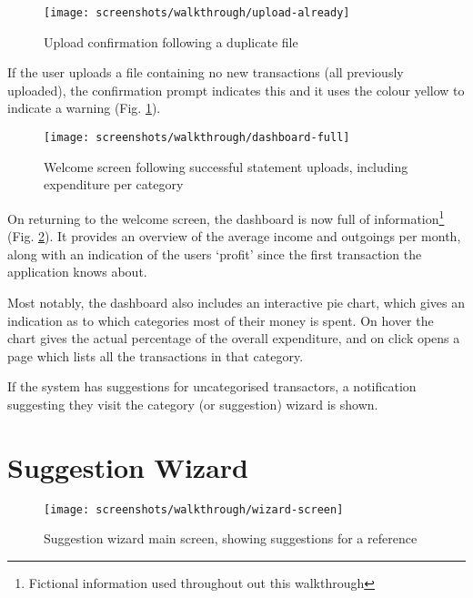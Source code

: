 \begin{figure}
\centering
\texttt{[image: screenshots/walkthrough/upload-already]}
\caption{Upload confirmation following a duplicate file}
\label{fig:upload-duplicate}
\end{figure}

If the user uploads a file containing no new transactions (all previously uploaded), the confirmation prompt indicates this and it uses the colour yellow to indicate a warning (Fig. \ref{fig:upload-duplicate}).

\begin{figure}
\centering
\texttt{[image: screenshots/walkthrough/dashboard-full]}
\caption[Welcome screen following successful statement uploads]{Welcome screen following successful statement uploads, including expenditure per category}
\label{fig:welcome-full}
\end{figure}


On returning to the welcome screen, the dashboard is now full of information\footnote{Fictional information used throughout out this walkthrough} (Fig. \ref{fig:welcome-full}). It provides an overview of the average income and outgoings per month, along with an indication of the users `profit' since the first transaction the application knows about. 

Most notably, the dashboard also includes an interactive pie chart, which gives an indication as to which categories most of their money is spent. On hover the chart gives the actual percentage of the overall expenditure, and on click opens a page which lists all the transactions in that category.

If the system has suggestions for uncategorised transactors, a notification suggesting they visit the category (or suggestion) wizard is shown.

\section{Suggestion Wizard}
\label{subsection:suggestion-wizard-walkthrough}

\begin{figure}
\centering
\texttt{[image: screenshots/walkthrough/wizard-screen]}
\caption[Suggestion wizard main screen]{Suggestion wizard main screen, showing suggestions for a reference}
\label{fig:wizard-screen}
\end{figure}

